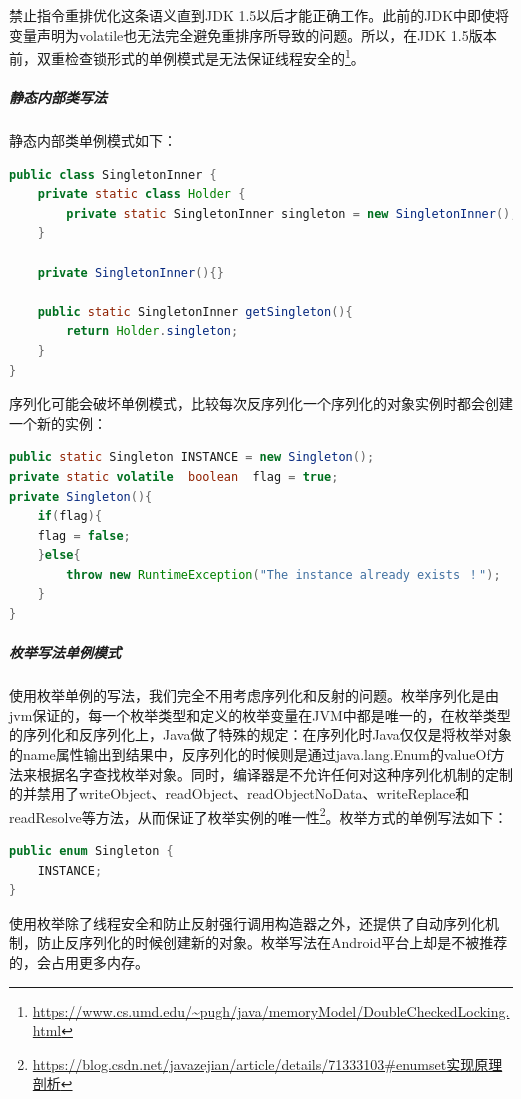 \documentclass[8pt]{book}
\numberwithin{dummy}{section}
\theoremstyle{ocrenumbox}
\theoremstyle{blacknumex}
\theoremstyle{blacknumbox}
\theoremstyle{ocrenum}
\begin{document}
禁止指令重排优化这条语义直到JDK 1.5以后才能正确工作。此前的JDK中即使将变量声明为volatile也无法完全避免重排序所导致的问题。所以，在JDK 1.5版本前，双重检查锁形式的单例模式是无法保证线程安全的\footnote{\url{https://www.cs.umd.edu/~pugh/java/memoryModel/DoubleCheckedLocking.html}}。

\subparagraph{静态内部类写法}

静态内部类单例模式如下：

\begin{lstlisting}[language=Java]
public class SingletonInner {
    private static class Holder {
        private static SingletonInner singleton = new SingletonInner();
    }

    private SingletonInner(){}

    public static SingletonInner getSingleton(){
        return Holder.singleton;
    }
}
\end{lstlisting}

序列化可能会破坏单例模式，比较每次反序列化一个序列化的对象实例时都会创建一个新的实例：

\begin{lstlisting}[language=Java]
public static Singleton INSTANCE = new Singleton();     
private static volatile  boolean  flag = true;
private Singleton(){
    if(flag){
    flag = false;   
    }else{
        throw new RuntimeException("The instance already exists ！");
    }
}
\end{lstlisting}

\subparagraph{枚举写法单例模式}

使用枚举单例的写法，我们完全不用考虑序列化和反射的问题。枚举序列化是由jvm保证的，每一个枚举类型和定义的枚举变量在JVM中都是唯一的，在枚举类型的序列化和反序列化上，Java做了特殊的规定：在序列化时Java仅仅是将枚举对象的name属性输出到结果中，反序列化的时候则是通过java.lang.Enum的valueOf方法来根据名字查找枚举对象。同时，编译器是不允许任何对这种序列化机制的定制的并禁用了writeObject、readObject、readObjectNoData、writeReplace和readResolve等方法，从而保证了枚举实例的唯一性\footnote{\url{https://blog.csdn.net/javazejian/article/details/71333103\#enumset实现原理剖析}}。枚举方式的单例写法如下：

\begin{lstlisting}[language=Java]
public enum Singleton {
    INSTANCE;
}
\end{lstlisting}

使用枚举除了线程安全和防止反射强行调用构造器之外，还提供了自动序列化机制，防止反序列化的时候创建新的对象。枚举写法在Android平台上却是不被推荐的，会占用更多内存。
\end{document}
